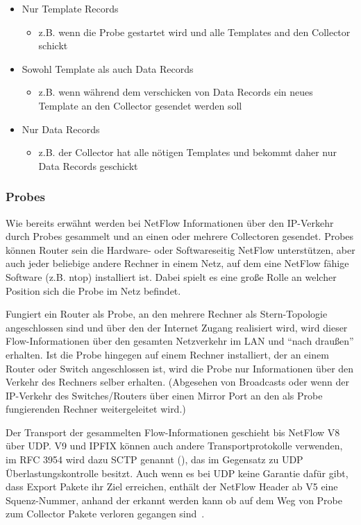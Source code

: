 \begin{itemize}
  \item Nur Template Records
  \begin{itemize}
    \item z.B. wenn die Probe gestartet wird und alle Templates and den
Collector schickt
  \end{itemize}
  \item Sowohl Template als auch Data Records
  \begin{itemize}
    \item z.B. wenn während dem verschicken von Data Records ein neues Template
an den Collector gesendet werden soll
  \end{itemize}
  \item Nur Data Records
  \begin{itemize}
    \item z.B. der Collector hat alle nötigen Templates und bekommt daher nur
Data Records geschickt
  \end{itemize}
\end{itemize}

\subsubsection{Probes}

Wie bereits erwähnt werden bei NetFlow Informationen über den IP-Verkehr durch
Probes gesammelt und an einen oder mehrere Collectoren gesendet. Probes können
Router sein die Hardware- oder Softwareseitig NetFlow unterstützen, aber auch
jeder beliebige andere Rechner in einem Netz, auf dem eine NetFlow fähige
Software (z.B. ntop) installiert ist. Dabei spielt es eine große Rolle an
welcher Position sich die Probe im Netz befindet.

Fungiert ein Router als Probe, an den mehrere Rechner als Stern-Topologie
angeschlossen sind und über den der Internet Zugang realisiert wird, wird dieser
Flow-Informationen über den gesamten Netzverkehr im LAN und \enquote{nach draußen}
erhalten. Ist die Probe hingegen auf einem Rechner installiert, der an einem
Router oder Switch angeschlossen ist, wird die Probe nur Informationen über den
Verkehr des Rechners selber erhalten. (Abgesehen von Broadcasts oder wenn der
IP-Verkehr des Switches/Routers über einen Mirror Port an den als Probe
fungierenden Rechner weitergeleitet wird.)

Der Transport der gesammelten Flow-Informationen geschieht bis NetFlow V8 über
UDP. V9 und IPFIX können auch andere Transportprotokolle verwenden, im RFC 3954
wird dazu SCTP genannt (\cite[6]{rfc-3954}), das im Gegensatz zu UDP
Überlastungskontrolle besitzt. Auch wenn es bei UDP keine Garantie dafür gibt,
dass Export Pakete ihr Ziel erreichen, enthält der NetFlow Header ab V5 eine
Squenz-Nummer, anhand der erkannt werden kann ob auf dem Weg von Probe zum
Collector Pakete verloren gegangen sind~\cite{netflow-cisco-sequence-number}.

